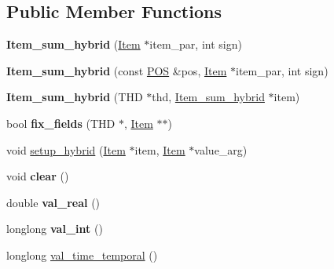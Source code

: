 \subsection*{Public Member Functions}
\begin{DoxyCompactItemize}
\item 
\mbox{\label{classItem__sum__hybrid_a70a3ad436422a10789f7497730c4c982}} 
{\bfseries Item\+\_\+sum\+\_\+hybrid} (\mbox{\hyperlink{classItem}{Item}} $\ast$item\+\_\+par, int sign)
\item 
\mbox{\label{classItem__sum__hybrid_ad5433f09365e08d128e63c650d373423}} 
{\bfseries Item\+\_\+sum\+\_\+hybrid} (const \mbox{\hyperlink{structYYLTYPE}{P\+OS}} \&pos, \mbox{\hyperlink{classItem}{Item}} $\ast$item\+\_\+par, int sign)
\item 
\mbox{\label{classItem__sum__hybrid_aa4d714fc0459f0be79ffea061b5d0f47}} 
{\bfseries Item\+\_\+sum\+\_\+hybrid} (T\+HD $\ast$thd, \mbox{\hyperlink{classItem__sum__hybrid}{Item\+\_\+sum\+\_\+hybrid}} $\ast$item)
\item 
\mbox{\label{classItem__sum__hybrid_a897b461ce430f3d70fd82136e6972927}} 
bool {\bfseries fix\+\_\+fields} (T\+HD $\ast$, \mbox{\hyperlink{classItem}{Item}} $\ast$$\ast$)
\item 
void \mbox{\hyperlink{classItem__sum__hybrid_ac38db5969a931eb6af553cc6d8dc6332}{setup\+\_\+hybrid}} (\mbox{\hyperlink{classItem}{Item}} $\ast$item, \mbox{\hyperlink{classItem}{Item}} $\ast$value\+\_\+arg)
\item 
\mbox{\label{classItem__sum__hybrid_abf97a40346852b2162aa53abefe3e2c2}} 
void {\bfseries clear} ()
\item 
\mbox{\label{classItem__sum__hybrid_ac09e54f682937b9f3d9e5b62c1244899}} 
double {\bfseries val\+\_\+real} ()
\item 
\mbox{\label{classItem__sum__hybrid_a3b8c68fc3269dc80ccbf8d6a464f8878}} 
longlong {\bfseries val\+\_\+int} ()
\item 
longlong \mbox{\hyperlink{classItem__sum__hybrid_a8de5e52f6be6c1d1e58a6f86b24c073f}{val\+\_\+time\+\_\+temporal}} ()
$$
\end{DoxyCompactItemize}
